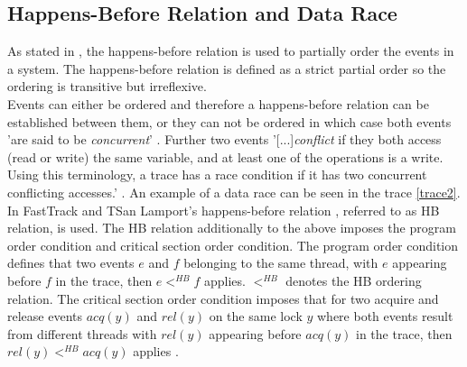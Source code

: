 \documentclass[12pt]{article}
\begin{document}
		\subsection{Happens-Before Relation and Data Race}
		As stated in \cite[p. 4]{sulzmann2}, the happens-before relation is used to partially order the events in a system. The happens-before relation is defined as a strict partial order so the ordering is transitive but irreflexive.\\
		Events can either be ordered and therefore a happens-before relation can be established between them, or they can not be ordered in which case both events 'are said to be \textit{concurrent}' \cite[p. 2]{lamport}. Further two events '[...]\textit{conflict} if they both access (read or write) the same variable, and at least one of the operations is a write. Using this terminology, a trace has a race condition if it has two concurrent conflicting accesses.' \cite[p. 2]{flanagan}. An example of a data race can be seen in the trace \ref{trace2}.\\
		In FastTrack and TSan Lamport's happens-before relation \cite{lamport}, referred to as HB relation, is used. The HB relation additionally to the above imposes the program order condition and critical section order condition. The program order condition defines that two events $e$ and $f$ belonging to the same thread, with $e$ appearing before $f$ in the trace, then $e <^{HB} f$ applies. $<^{HB}$ denotes the HB ordering relation. The critical section order condition imposes that for two acquire and release events $acq(y)$ and $rel(y)$ on the same lock $y$ where both events result from different threads with $rel(y)$ appearing before $acq(y)$ in the trace, then $rel(y) <^{HB} acq(y)$ applies \cite[p. 4]{sulzmann2}.
\end{document}
